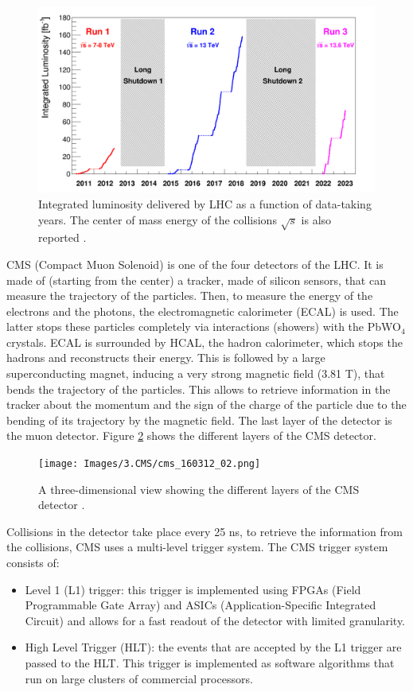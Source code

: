 \begin{figure}[hbt]
    \centering
    \includegraphics[width=0.5\linewidth]{Images/3.CMS/Run plots.png}
    \caption{Integrated luminosity delivered by LHC as a function of data-taking years. The center of mass energy of the collisions $\sqrt{s}$ is also reported \cite{Runplot}.}
    \label{fig: Runs}
\end{figure}



CMS (Compact Muon Solenoid) is one of the four detectors of the LHC. It is made of (starting from the center) a tracker, made of silicon sensors, that can measure the trajectory of the particles. Then, to measure the energy of the electrons and the photons, the electromagnetic calorimeter (ECAL) is used. The latter stops these particles completely via interactions (showers) with the PbWO$_4$ crystals. ECAL is surrounded by HCAL, the hadron calorimeter, which stops the hadrons and reconstructs their energy. This is followed by a large superconducting magnet, inducing a very strong magnetic field (3.81 T), that bends the trajectory of the particles. This allows to retrieve information in the tracker about the momentum and the sign of the charge of the particle due to the bending of its trajectory by the magnetic field. The last layer of the detector is the muon detector. Figure \ref{fig: CMS detector} shows the different layers of the CMS detector. 

\begin{figure}[hbt]
    \centering
    \texttt{[image: Images/3.CMS/cms\_160312\_02.png]}
    \caption{A three-dimensional view showing the different layers of the CMS detector \cite{CMS3D}.}
    \label{fig: CMS detector}
\end{figure}

Collisions in the detector take place every 25 ns, to retrieve the information from the collisions, CMS uses a multi-level trigger system. The CMS trigger system consists of:
\begin{itemize}
    \item Level 1 (L1) trigger: this trigger is implemented using FPGAs (Field Programmable Gate Array) and ASICs (Application-Specific Integrated Circuit) and allows for a fast readout of the detector with limited granularity. \cite{L1Trigger}
    \item High Level Trigger (HLT): the events that are accepted by the L1 trigger are passed to the HLT. This trigger is implemented as software algorithms that run on large clusters of commercial processors. \cite{HLT}
\end{itemize}

